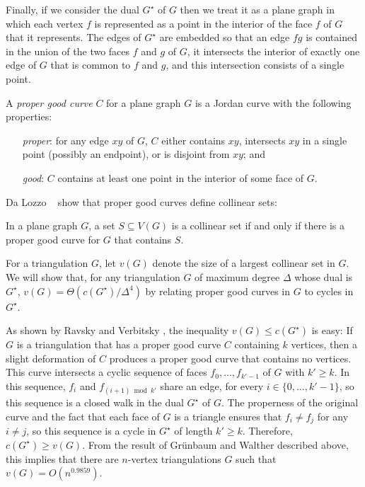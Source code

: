 \documentclass{patmorin}
\newcommand{\dual}[1]{{#1}^\star}
\begin{document}
Finally, if we consider the dual $\dual{G}$ of $G$ then we treat it
as a plane graph in which each vertex $f$ is represented as a point in
the interior of the face $f$ of $G$ that it represents.  The edges of
$\dual{G}$ are embedded so that an edge $fg$ is contained in the union of
the two faces $f$ and $g$ of $G$, it intersects the interior of exactly
one edge of $G$ that is common to $f$ and $g$, and this intersection
consists of a single point.

A \emph{proper good curve} $C$ for a plane graph $G$ is a
Jordan curve with the following properties:
\begin{enumerate}
	\item[\emph{proper}:] for any edge $xy$ of $G$, $C$ either contains $xy$, intersects
  $xy$ in a single point (possibly an endpoint), or is disjoint
  from $xy$; and
  \item[\emph{good}:] $C$ contains at least one point in the interior of
  some face of $G$.
\end{enumerate}

Da Lozzo \etal\ \cite{dalozzo.dujmovic.ea:drawing} show that proper good
curves define collinear sets:

\begin{thm}
  In a plane graph $G$, a set $S\subseteq V(G)$ is a collinear set if
  and only if there is a proper good curve for $G$ that contains $S$.
\end{thm}

For a triangulation $G$, let $v(G)$ denote the size of a largest
collinear set in $G$.  We will show that, for any triangulation $G$
of maximum degree $\Delta$
whose dual is $\dual{G}$, $v(G)=\Theta(c(\dual{G})/\Delta^4)$ by relating proper good curves in $G$ to cycles in $\dual{G}$.

As shown by Ravsky and Verbitsky
\cite{ravsky.verbitsky:on,ravsky.verbitsky:on-arxiv}, the inequality $v(G)
\le c(\dual{G})$ is easy: If $G$ is a triangulation that has a proper
good curve $C$ containing $k$ vertices, then a slight deformation of
$C$ produces a proper good curve that contains no vertices. This curve
intersects a cyclic sequence of faces $f_0,\ldots,f_{k'-1}$ of $G$
with $k'\ge k$.  In this sequence, $f_i$ and $f_{(i+1)\bmod k'}$ share
an edge, for every $i\in\{0,\ldots,k'-1\}$, so this sequence is a closed
walk in the dual $\dual{G}$ of $G$.  The properness of the original curve
and the fact that each face of $G$ is a triangle ensures that $f_i\neq
f_j$ for any $i\neq j$, so this sequence is a cycle in $\dual{G}$ of
length $k'\ge k$.  Therefore, $c(\dual{G})\ge v(G)$. From the result
of Gr\"unbaum and Walther described above, this implies that there are
$n$-vertex triangulations $G$ such that $v(G) = O(n^{0.9859})$.
\end{document}
